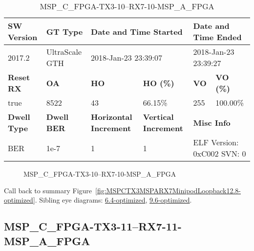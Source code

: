 \begin{table}[h]
\centering
\caption{MSP\_C\_FPGA-TX3-10--RX7-10-MSP\_A\_FPGA}
\label{tab:MSPCFPGATX310RX710MSPAFPGA12.8-optimized}
\begin{tabular}{@{}|l|l|l|l|l|l|@{}}
\toprule
\textbf{SW Version}                & \textbf{GT Type}   & \multicolumn{2}{l|}{\textbf{Date and Time Started}}            & \multicolumn{2}{l|}{\textbf{Date and Time Ended}}        \\ \midrule
2017.2                       & UltraScale GTH          & \multicolumn{2}{l|}{2018-Jan-23 23:39:07}                   & \multicolumn{2}{l|}{2018-Jan-23 23:39:27}               \\ \midrule
\textbf{Reset RX}                  & \textbf{OA} & \textbf{HO}   & \textbf{HO (\%)} & \textbf{VO} & \textbf{VO (\%)} \\ \midrule
true & 8522        & 43          & 66.15\%        & 255        & 100.00\%       \\ \midrule
\textbf{Dwell Type}                & \textbf{Dwell BER} & \textbf{Horizontal Increment} & \textbf{Vertical Increment}    & \multicolumn{2}{l|}{\textbf{Misc Info}}                  \\ \midrule
BER                            & 1e-7        & 1        & 1           & \multicolumn{2}{l|}{ELF Version: 0xC002 SVN: 0}                         \\ \bottomrule
\end{tabular}
\end{table}

\begin{figure}[h]
\caption{MSP\_C\_FPGA-TX3-10--RX7-10-MSP\_A\_FPGA} \label{fig:MSPCFPGATX310RX710MSPAFPGA12.8-optimized}
\end{figure}

Call back to summary Figure~\ref{fig:MSPCTX3MSPARX7MinipodLoopback12.8-optimized}.
Sibling eye diagrams: \hyperref[sec:MSPCFPGATX310RX710MSPAFPGA6.4-optimized]{6.4-optimized}, \hyperref[sec:MSPCFPGATX310RX710MSPAFPGA9.6-optimized]{9.6-optimized}.

\clearpage
\newpage


\subsection{MSP\_C\_FPGA-TX3-11--RX7-11-MSP\_A\_FPGA}\label{sec:MSPCFPGATX311RX711MSPAFPGA12.8-optimized}

